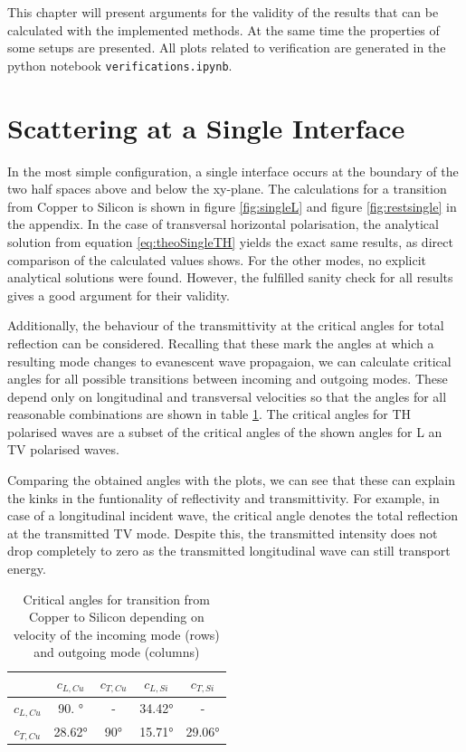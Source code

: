 This chapter will present arguments for the validity of the results that can be
calculated with the implemented methods. At the same time the properties of
some setups are presented. All plots related to verification are generated in
the
python notebook \texttt{verifications.ipynb}.

\section{Scattering at a Single Interface}
In the most simple configuration, a single interface occurs at the boundary of
the two half spaces above and below the xy-plane.
The calculations for a transition from Copper to Silicon is shown in figure
\ref{fig:singleL} and figure \ref{fig:restsingle} in the appendix. In the case
of transversal horizontal polarisation, the analytical solution from equation
\ref{eq:theoSingleTH} yields the exact same results, as direct comparison of
the calculated values shows. For the other modes, no explicit analytical
solutions were found. However, the fulfilled sanity check for all results
gives a good argument for their validity.

Additionally, the behaviour of the transmittivity at the critical angles for
total reflection can be considered. Recalling that these mark the angles at
which a resulting mode changes to evanescent wave propagaion, we can calculate
critical angles for all possible transitions between incoming and outgoing
modes. These depend only on longitudinal and transversal velocities so that
the angles for all reasonable combinations are shown in table
\ref{tab:critangles}.
The critical angles for TH polarised waves are a subset of the critical angles
of the shown angles for L an TV polarised waves.

Comparing the obtained angles with the plots, we can see that these can explain
the kinks in the funtionality of reflectivity and transmittivity. For example,
in case of a longitudinal incident wave, the critical angle denotes the total
reflection at the transmitted TV mode. Despite this, the transmitted intensity
does not drop completely to zero as the transmitted longitudinal wave can still
transport energy.
\begin{table}[p]
    \centering
    \begin{tabular}{c||c|c|c|c}
                   & $c_{L,Cu}$  & $c_{T,Cu}$ & $c_{L,Si}$  & $c_{T,Si}$
        \\ \hline
        $c_{L,Cu}$ & \ang{90. }  & -          & \ang{34.42} & -
        \\
        $c_{T,Cu}$ & \ang{28.62} & \ang{90}   & \ang{15.71} & \ang{29.06}
    \end{tabular}
    \caption{Critical angles for transition from Copper to Silicon depending on
        velocity of the incoming mode (rows) and outgoing mode (columns)}
    \label{tab:critangles}
\end{table}

